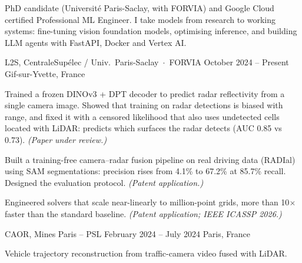 




\noindent
PhD candidate (Université Paris-Saclay, with FORVIA) and Google Cloud certified Professional
ML Engineer. I take models from research to working systems: fine-tuning vision foundation
models, optimising inference, and building LLM agents with FastAPI, Docker and Vertex AI.
\vspace{1pt}


%
        {L2S, CentraleSupélec / Univ.\ Paris-Saclay \,$\cdot$\, FORVIA}%
        {October 2024 -- Present}%
        {Gif-sur-Yvette, France}
\begin{cvitems}
  \item Trained a frozen DINOv3 + DPT decoder to predict radar reflectivity from a single camera
        image. Showed that training on radar detections is biased with range, and fixed it with a
        censored likelihood that also uses undetected cells located with LiDAR: predicts which
        surfaces the radar detects (AUC 0.85 vs 0.73). \emph{(Paper under review.)}
  \item Built a training-free camera--radar fusion pipeline on real driving data (RADIal) using
        SAM segmentations: precision rises from 4.1\% to 67.2\% at 85.7\% recall. Designed
        the evaluation protocol. \emph{(Patent application.)}
  \item Engineered solvers that scale near-linearly to million-point grids, more than
        10$\times$ faster than the standard baseline. \emph{(Patent application; IEEE ICASSP 2026.)}
\end{cvitems}

%
        {CAOR, Mines Paris -- PSL}%
        {February 2024 -- July 2024}%
        {Paris, France}
\begin{cvitems}
  \item Vehicle trajectory reconstruction from traffic-camera video fused with LiDAR.
\end{cvitems}

